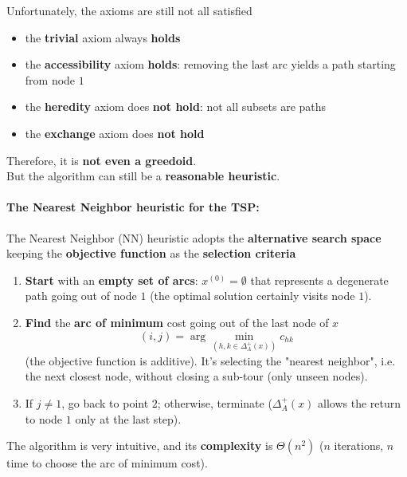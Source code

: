 Unfortunately, the axioms are still not all satisfied
\begin{itemize}
	\item the \textbf{trivial} axiom always \textbf{holds}
	\item the \textbf{accessibility} axiom \textbf{holds}: removing the last arc yields a path starting from node $1$
	\item the \textbf{heredity} axiom does \textbf{not hold}: not all subsets are paths
	\item the \textbf{exchange} axiom does \textbf{not hold}
\end{itemize}

Therefore, it is \textbf{not even a greedoid}.\\

But the algorithm can still be a \textbf{reasonable heuristic}.\\

\newpage

\paragraph{The Nearest Neighbor heuristic for the TSP:} The Nearest Neighbor (NN) heuristic adopts the \textbf{alternative search space} keeping the \textbf{objective function} as the \textbf{selection criteria}
\begin{enumerate}
	\item \textbf{Start} with an \textbf{empty set of arcs}: $x^{(0)} = \emptyset$ that represents a degenerate path going out of node $1$ (the optimal solution certainly visits node $1$).\\
	
	\item \textbf{Find} the \textbf{arc of minimum} cost going out of the last node of $x$
	$$ (i,j) = \arg \min_{(h,k \in \Delta_A^+ (x))} c_{hk} $$
	(the objective function is additive). It's selecting the "nearest neighbor", i.e. the next closest node, without closing a sub-tour (only unseen nodes).\\
	
	\item If $j \neq 1$, go back to point $2$; otherwise, terminate ($\Delta_A^+ (x)$ allows the return to node $1$ only at the last step).\\
\end{enumerate}

The algorithm is very intuitive, and its \textbf{complexity} is $\Theta (n^2)$ ($n$ iterations, $n$ time to choose the arc of minimum cost).\\

